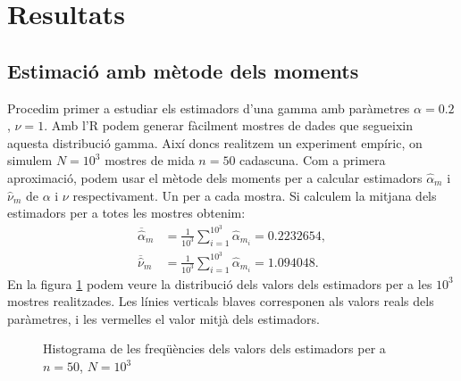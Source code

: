 \documentclass[12pt, catalan]{article}
\numberwithin{table}{section}
\numberwithin{figure}{section}
\numberwithin{equation}{section}
\begin{document}
\section{Resultats}

\subsection{Estimació amb mètode dels moments}
Procedim primer a estudiar els estimadors d'una gamma amb paràmetres $\alpha=0.2$, $\nu=1$. Amb l'R podem generar fàcilment mostres de dades que segueixin aquesta distribució gamma. Així doncs realitzem un experiment empíric, on simulem $N=10^3$ mostres de mida $n=50$ cadascuna.
Com a primera aproximació, podem usar el mètode dels moments per a calcular estimadors $\hat{\alpha}_m$ i $\hat{\nu}_m$ de $\alpha$ i $\nu$ respectivament. Un per a cada mostra.  Si calculem la mitjana dels estimadors per a totes les mostres obtenim:
\begin{align*}
    \overline{\hat{\alpha}}_m&=\frac{1}{10^3}\sum_{i=1}^{10^3}\hat{\alpha}_{m_i}= 0.2232654,\\
    \overline{\hat{\nu}}_m&=\frac{1}{10^3}\sum_{i=1}^{10^3}\hat{\alpha}_{m_i}= 1.094048.
\end{align*}
En la figura \ref{first} podem veure la distribució dels valors dels estimadors per a les $10^3$ mostres realitzades. Les línies verticals blaves corresponen als valors reals dels paràmetres, i les vermelles el valor mitjà dels estimadors.
\begin{figure}[!ht]
     \hfill
     \caption{Histograma de les freqüències dels valors dels estimadors per a $n=50$, $N=10^3$}
     \label{first}
  \end{figure}
  
\end{document}
